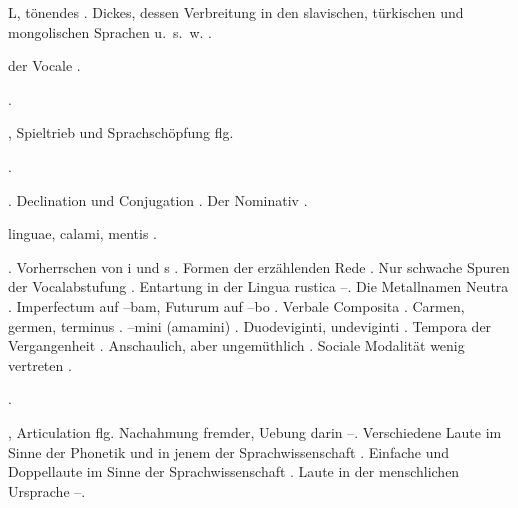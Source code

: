 \begin{register}
L, tönendes \pageref{sp.186}. Dickes, dessen Verbreitung in den slavischen, türkischen und mongolischen Sprachen u.~s.~w. \pageref{sp.269}.


 der Vocale \pageref{sp.37}.

 \pageref{sp.36}.




, Spieltrieb und Sprachschöpfung \pageref{sp.308} flg.

 \pageref{sp.149}\sed{, \pageref{sp.257}, \pageref{sp.426}}.

. Declination und Conjugation \pageref{sp.350}.  Der Nominativ \pageref{sp.391}.

 linguae, calami, mentis \pageref{sp.43}.

. Vorherrschen von i und s \pageref{sp.34}. Formen der erzählenden Rede \pageref{sp.99}. Nur schwache Spuren der Vocalabstufung \pageref{sp.149}. Entartung in der Lingua rustica \pageref{sp.182}–\pageref{sp.183}.  Die Metallnamen Neutra \pageref{sp.237}. Imperfectum auf –bam, Futurum auf –bo \pageref{sp.241}. Verbale Composita \pageref{sp.243}. Carmen, germen, terminus \pageref{sp.292}. –mini (amamini) \pageref{sp.384}. Duodeviginti, undeviginti \pageref{sp.401}. Tempora der Vergangenheit \pageref{sp.409}. Anschaulich, aber ungemüthlich \pageref{sp.473}. Sociale Modalität wenig vertreten \pageref{sp.474}.

 \pageref{sp.187}.

, Articulation \pageref{sp.4} flg. Nachahmung fremder, Uebung darin \pageref{sp.33}–\pageref{sp.39}. Verschiedene Laute im Sinne der Phonetik und in jenem der Sprachwissenschaft \pageref{sp.33}. Einfache und Doppellaute im Sinne der Sprachwissenschaft \pageref{sp.135}.  Laute in der menschlichen Ursprache \pageref{sp.313}–\pageref{sp.315}.



\end{register}
